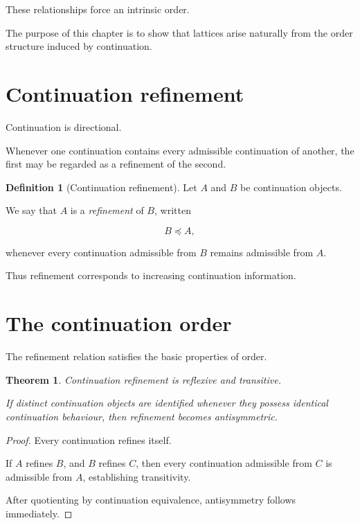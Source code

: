 \documentclass[13pt,openany]{book}
\theoremstyle{plain}
\newtheorem{theorem}{Theorem}[chapter]
\theoremstyle{definition}
\newtheorem{definition}{Definition}[chapter]
\begin{document}
These relationships force an intrinsic order.

The purpose of this chapter is to show that lattices arise naturally from the
order structure induced by continuation.

\section{Continuation refinement}

Continuation is directional.

Whenever one continuation contains every admissible continuation of another,
the first may be regarded as a refinement of the second.

\begin{definition}[Continuation refinement]
Let \(A\) and \(B\) be continuation objects.

We say that \(A\) is a \emph{refinement} of \(B\), written

\[
B\preccurlyeq A,
\]

whenever every continuation admissible from \(B\) remains admissible from
\(A\).
\end{definition}

Thus refinement corresponds to increasing continuation information.

\section{The continuation order}

The refinement relation satisfies the basic properties of order.

\begin{theorem}
Continuation refinement is reflexive and transitive.

If distinct continuation objects are identified whenever they possess identical
continuation behaviour, then refinement becomes antisymmetric.
\end{theorem}

\begin{proof}
Every continuation refines itself.

If \(A\) refines \(B\), and \(B\) refines \(C\), then every continuation
admissible from \(C\) is admissible from \(A\), establishing transitivity.

After quotienting by continuation equivalence, antisymmetry follows
immediately.
\end{proof}
\end{document}
